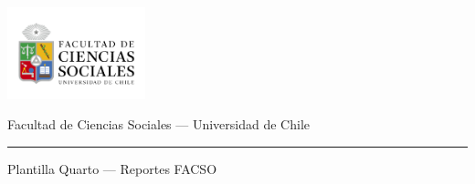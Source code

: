 \makeatletter
\providecommand{\subtitle}[1]{\gdef\@subtitle{#1}}
\providecommand{\@subtitle}{}

\newcommand{\PrintTitle}{%
  {\sffamily\bfseries\fontsize{22pt}{26pt}\selectfont \@title\par}%
}
\newcommand{\PrintSubtitle}{%
  \begingroup
  \edef\temp{\detokenize{\@subtitle}}%
  \ifx\temp\empty\relax
  \else
    {\sffamily\large\itshape \@subtitle\par}%
  \fi
  \endgroup
}
\newcommand{\PrintAuthor}{%
  {\normalsize \@author\par}%
}
\newcommand{\PrintDate}{%
  {\small \@date\par}%
}
\makeatother

\begin{titlepage}
\thispagestyle{empty}
\begin{center}
\vspace*{10mm}

\includegraphics[width=0.30\textwidth]{assets/cover.png}\par
\vspace{12mm}

\PrintTitle
\vspace{4mm}
\PrintSubtitle

\vspace{16mm}
\PrintAuthor
\vspace{2mm}
\PrintDate

\vspace{8mm}
{\small Facultad de Ciencias Sociales — Universidad de Chile \par}

\vfill
\rule{.6\textwidth}{0.6pt}\par
{\footnotesize Plantilla Quarto — Reportes FACSO\par}

\end{center}
\end{titlepage}

\frontmatter
\pagestyle{plain}

\setcounter{tocdepth}{2} %
